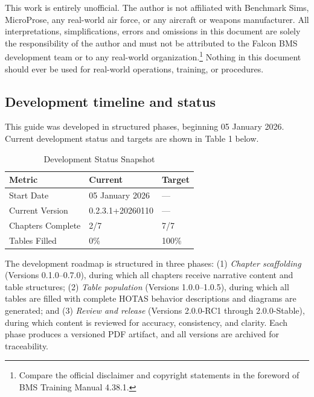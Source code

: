 \documentclass[11pt,a4paper]{article}
\providecommand{\trnman}{BMS Training Manual 4.38.1}
\newcommand{\docversion}{0.2.3.1}
\newcommand{\docbuild}{20260110}
\newcommand{\docstartdate}{05 January 2026}
\newcommand{\chapterscompletedof}{2/7}
\newcommand{\tablesfilledpct}{0\%}
\newcommand{\fulldocversion}{\docversion+\docbuild}
\begin{document}
This work is entirely unofficial. The author is not affiliated with Benchmark Sims, MicroProse, any real-world air force, or any aircraft or weapons manufacturer. All interpretations, simplifications, errors and omissions in this document are solely the responsibility of the author and must not be attributed to the Falcon BMS development team or to any real-world organization.\footnote{Compare the official disclaimer and copyright statements in the foreword of \trnman{}.} Nothing in this document should ever be used for real-world operations, training, or procedures.

\subsection{Development timeline and status}

This guide was developed in structured phases, beginning \docstartdate{}. Current development status and targets are shown in Table 1 below.

\begin{table}[h]
\centering
\caption{Development Status Snapshot}
\begin{tabular}{L{3.2cm} L{2.5cm} L{2.5cm}}
\toprule
\textbf{Metric} & \textbf{Current} & \textbf{Target} \\
\midrule
Start Date & \docstartdate & --- \\
Current Version & \fulldocversion & --- \\
Chapters Complete & \chapterscompletedof & 7/7 \\
Tables Filled & \tablesfilledpct & 100\% \\
\bottomrule
\end{tabular}
\end{table}

The development roadmap is structured in three phases: (1) \emph{Chapter scaffolding} (Versions 0.1.0--0.7.0), during which all chapters receive narrative content and table structures; (2) \emph{Table population} (Versions 1.0.0--1.0.5), during which all tables are filled with complete HOTAS behavior descriptions and diagrams are generated; and (3) \emph{Review and release} (Versions 2.0.0-RC1 through 2.0.0-Stable), during which content is reviewed for accuracy, consistency, and clarity. Each phase produces a versioned PDF artifact, and all versions are archived for traceability.
\end{document}
